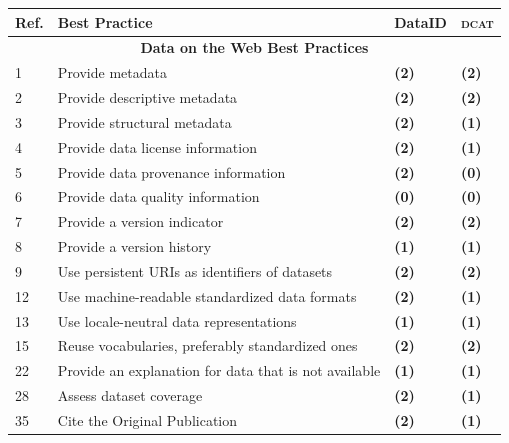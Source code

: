 \documentclass[a4paper,english,twoside,BCOR1.5cm,headsepline,DIV12,appendixprefix,final,12pt]{scrbook}
\newcommand{\dataid}{{\ttfamily\bfseries DataID}\xspace}
\newcommand{\dcat}{{\scshape\bfseries dcat}\xspace}
\begin{document}
\begin{table}[!htbp]
    \centering
    \begin{tabular}{l|l|l|l}
        \hline
        Ref. & Best Practice & \dataid & \dcat\\
        \hline
        \multicolumn{4}{c}{\textbf{Data on the Web Best Practices}} \\
        \hline
        1 & Provide metadata & \textbf{\color{ForestGreen}(2)} & \textbf{\color{ForestGreen}(2)}\\
        2 & Provide descriptive metadata & \textbf{\color{ForestGreen}(2)} & \textbf{\color{ForestGreen}(2)}\\
        3 & Provide structural metadata & \textbf{\color{ForestGreen}(2)} & \textbf{\color{BurntOrange}(1)}\\
        4 & Provide data license information & \textbf{\color{ForestGreen}(2)} & \textbf{\color{BurntOrange}(1)}\\
        5 & Provide data provenance information & \textbf{\color{ForestGreen}(2)} & \textbf{\color{Mahogany}(0)}\\
        6 & Provide data quality information & \textbf{\color{Mahogany}(0)} & \textbf{\color{Mahogany}(0)}\\
        7 & Provide a version indicator & \textbf{\color{ForestGreen}(2)} & \textbf{\color{ForestGreen}(2)}\\
        8 & Provide a version history & \textbf{\color{BurntOrange}(1)} & \textbf{\color{BurntOrange}(1)}\\
        9 & Use persistent URIs as identifiers of datasets & \textbf{\color{ForestGreen}(2)} & \textbf{\color{ForestGreen}(2)}\\
        12 & Use machine-readable standardized data formats & \textbf{\color{ForestGreen}(2)} & \textbf{\color{BurntOrange}(1)}\\
        13 & Use locale-neutral data representations & \textbf{\color{BurntOrange}(1)} & \textbf{\color{BurntOrange}(1)}\\
        15 & Reuse vocabularies, preferably standardized ones & \textbf{\color{ForestGreen}(2)} & \textbf{\color{ForestGreen}(2)}\\
        22 & Provide an explanation for data that is not available & \textbf{\color{BurntOrange}(1)} & \textbf{\color{BurntOrange}(1)}\\
        28 & Assess dataset coverage & \textbf{\color{ForestGreen}(2)} & \textbf{\color{BurntOrange}(1)}\\
        35 & Cite the Original Publication & \textbf{\color{ForestGreen}(2)} & \textbf{\color{BurntOrange}(1)}\\

\end{tabular}
\end{table}
\end{document}
